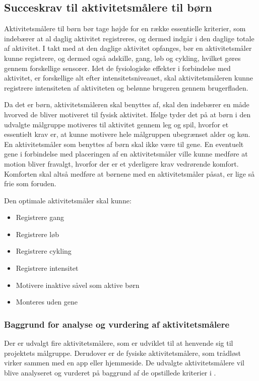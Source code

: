 \subsection{Succeskrav til aktivitetsmålere til børn} \label{succeskrav}

Aktivitetsmålere til børn bør tage højde for en række essentielle kriterier, som indebærer at al daglig aktivitet registreres, og dermed indgår i den daglige totale af aktivitet. I takt med at den daglige aktivitet opfanges, bør en aktivitetsmåler kunne registrere, og dermed også adskille, gang, løb og cykling, hvilket gøres gennem forskellige sensorer. 
Idet de fysiologiske effekter i forbindelse med aktivitet, er forskellige alt efter intensitetsniveauet, skal aktivitetsmåleren kunne registrere intensiteten af aktiviteten og belønne brugeren gennem brugerfladen.

Da det er børn, aktivitetsmåleren skal benyttes af, skal den indebærer en måde hvorved de bliver motiveret til fysisk aktivitet. Ifølge  tyder det på at børn i den udvalgte målgruppe motiveres til aktivitet gennem leg og spil, hvorfor et essentielt krav er, at kunne motivere hele målgruppen ubegrænset alder og køn. \newline
En aktivitetsmåler som benyttes af børn skal ikke være til gene. En eventuelt gene i forbindelse med placeringen af en aktivitetsmåler ville kunne medføre at motion bliver fravalgt, hvorfor der er et yderligere krav vedrørende komfort. Komforten skal altså medføre at børnene med en aktivitetsmåler påsat, er lige så frie som foruden.

Den optimale aktivitetsmåler skal kunne: 
\begin{itemize}
\item Registrere gang
\item Registrere løb
\item Registrere cykling
\item Registrere intensitet %
\item Motivere inaktive såvel som aktive børn %
\item Monteres uden gene
\end{itemize}

\subsubsection{Baggrund for analyse og vurdering af aktivitetsmålere}
Der er udvalgt fire aktivitetsmålere, som er udviklet til at henvende sig til projektets målgruppe. Derudover er de fysiske aktivitetsmålere, som trådløst virker sammen med en app eller hjemmeside. 
De udvalgte aktivitetsmålere vil blive analyseret og vurderet på baggrund af de opstillede kriterier i .

